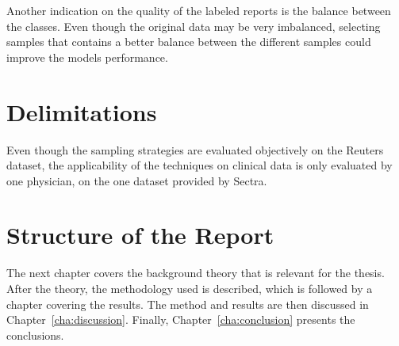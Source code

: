 \begin{enumerate}
      Another indication on the quality of the labeled reports is the balance between the classes.
      Even though the original data may be very imbalanced, selecting samples that contains a better balance between the different samples could improve the models performance.
\end{enumerate}

\section{Delimitations}
\label{sec:delimitations}

Even though the sampling strategies are evaluated objectively on the Reuters dataset, the applicability of the techniques on clinical data is only evaluated by one physician, on the one dataset provided by Sectra.

\section{Structure of the Report}
\label{sec:structure}

The next chapter covers the background theory that is relevant for the thesis.
After the theory, the methodology used is described, which is followed by a chapter covering the results.
The method and results are then discussed in Chapter~\ref{cha:discussion}.
Finally, Chapter~\ref{cha:conclusion} presents the conclusions.